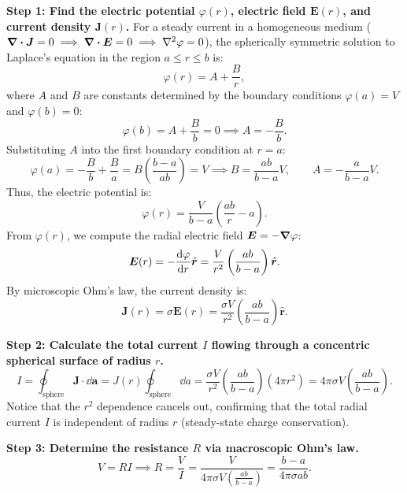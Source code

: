 \begin{example}
\textbf{Step 1: Find the electric potential $\varphi(r)$, electric field $\bm{E}(r)$, and current density $\bm{J}(r)$.}
For a steady current in a homogeneous medium ($\div{\bm{J}} = 0 \implies \div{\bm{E}} = 0 \implies \laplacian{\varphi} = 0$), the spherically symmetric solution to Laplace's equation in the region $a \le r \le b$ is:
\begin{equation*}
    \varphi(r) = A + \frac{B}{r},
\end{equation*}
where $A$ and $B$ are constants determined by the boundary conditions $\varphi(a) = V$ and $\varphi(b) = 0$:
\begin{equation*}
    \varphi(b) = A + \frac{B}{b} = 0 \implies A = -\frac{B}{b}.
\end{equation*}
Substituting $A$ into the first boundary condition at $r=a$:
\begin{equation*}
    \varphi(a) = -\frac{B}{b} + \frac{B}{a} = B \left( \frac{b - a}{ab} \right) = V \implies B = \frac{ab}{b - a} V, \qquad A = -\frac{a}{b - a} V.
\end{equation*}
Thus, the electric potential is:
\begin{equation*}
    \varphi(r) = \frac{V}{b - a} \left( \frac{ab}{r} - a \right).
\end{equation*}
From $\varphi(r)$, we compute the radial electric field $\bm{E} = -\grad{\varphi}$:
\begin{equation*}
    \bm{E}(r) = -\dv{\varphi}{r} \hat{\bm{r}} = \frac{V}{r^2} \left( \frac{ab}{b - a} \right) \hat{\bm{r}}.
\end{equation*}
By microscopic Ohm's law, the current density is:
\begin{equation*}
    \bm{J}(r) = \sigma \bm{E}(r) = \frac{\sigma V}{r^2} \left( \frac{ab}{b - a} \right) \hat{\bm{r}}.
\end{equation*}

\textbf{Step 2: Calculate the total current $I$ flowing through a concentric spherical surface of radius $r$.}
\begin{equation*}
    I = \oint_{\text{sphere}} \bm{J} \cdot \dd{\bm{a}} = J(r) \oint_{\text{sphere}} \dd{a} = \frac{\sigma V}{r^2} \left( \frac{ab}{b - a} \right) \left( 4\pi r^2 \right) = 4\pi \sigma V \left( \frac{ab}{b - a} \right).
\end{equation*}
Notice that the $r^2$ dependence cancels out, confirming that the total radial current $I$ is independent of radius $r$ (steady-state charge conservation).

\textbf{Step 3: Determine the resistance $R$ via macroscopic Ohm's law.}
\begin{equation}
    V = R I \implies R = \frac{V}{I} = \frac{V}{4\pi \sigma V \left(\frac{ab}{b-a}\right)} = \frac{b - a}{4\pi \sigma a b}.
\end{equation}
\end{example}

